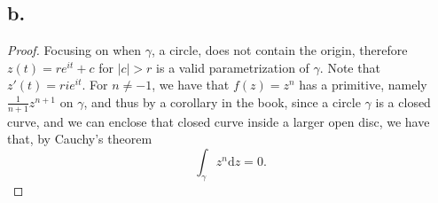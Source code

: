 \documentclass{article}
\begin{document}
\subsection*{b.}
\begin{proof}
  Focusing on when $\gamma$, a circle, does not contain the origin, therefore $z(t) = re^{it} + c$ for $|c| > r$ is a valid parametrization of $\gamma$. Note that $z'(t) = rie^{it}$. For $n \neq -1$, we have that $f(z) = z^n$ has a primitive, namely $\frac{1}{n + 1}z^{n + 1}$ on $\gamma$, and thus by a corollary in the book, since a circle $\gamma$ is a closed curve, and we can enclose that closed curve inside a larger open disc, we have that, by Cauchy's theorem
  \[
  \int_{\gamma} z^n \mathrm{d}z = 0. 
  \] 


\end{proof}
\end{document}
